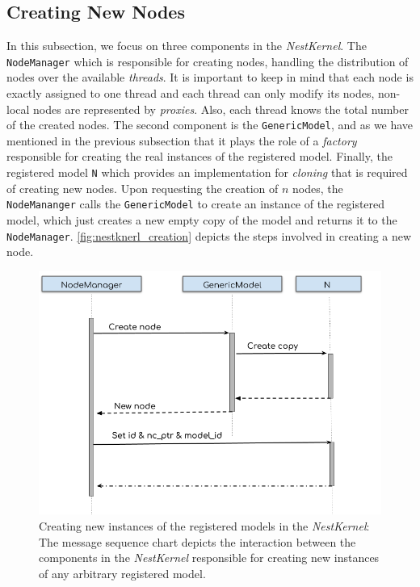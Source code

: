 \subsection{Creating New Nodes}

In this subsection, we focus on three components in the \emph{NestKernel}. The \texttt{NodeManager} which is responsible for creating nodes, handling the distribution of nodes over the available \emph{threads}.
It is important to keep in mind that each node is exactly assigned to one thread and each thread can only modify its nodes, non-local nodes are represented by \emph{proxies}. Also, each thread knows the total number of the created nodes. The second component
is the \texttt{GenericModel}, and as we have mentioned in the previous subsection that it plays the role of a \emph{factory} responsible for creating the real instances of the registered model. Finally, the registered model \texttt{N} which provides an implementation for \emph{cloning} that is required of creating new nodes.
Upon requesting the creation of $n$ nodes, the \texttt{NodeMananger} calls the \texttt{GenericModel} to create an instance of the registered model, which just creates a new empty copy of the model and returns it to the \texttt{NodeManager}. \autoref{fig:nestknerl_creation} depicts the steps involved in creating a new node.


\begin{figure}[ht!]
\centering
\includegraphics[width=1\textwidth,height=1\textheight,keepaspectratio]{src/pic/nodes_creation.png}
\caption{Creating new instances of the registered models in the \emph{NestKernel}: The message sequence chart depicts the interaction between the components in the \emph{NestKernel} responsible for creating new instances of any arbitrary registered model.}
\label{fig:nestknerl_creation}
\end{figure}



